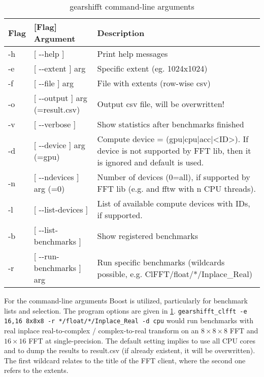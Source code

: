 
\begin{table}[htp]
 \centering
 \caption{gearshifft command-line arguments}
 \label{tab:cmdargs}
  \begin{tabular}{llp{6.4cm}}
\toprule
Flag & [Flag] Argument & Description \\
\midrule
-h&[ -{}-help ]                    &Print help messages \\
-e&[ -{}-extent ] arg              &Specific extent (eg. 1024x1024) \\
-f&[ -{}-file ] arg                &File with extents (row-wise csv) \\
-o&[ -{}-output ] arg (=result.csv)&Output csv file, will be overwritten! \\
-v&[ -{}-verbose ]                 &Show statistics after benchmarks finished \\
-d&[ -{}-device ] arg (=gpu)       &Compute device = (gpu|cpu|acc|<ID>). If 
                                  device is not supported by FFT lib, then it
                                  is ignored and default is used. \\
-n&[ -{}-ndevices ] arg (=0)       &Number of devices (0=all), if supported by 
                                  FFT lib (e.g. \clfft{} and fftw with n CPU 
                                  threads). \\
-l&[ -{}-list-devices ]            &List of available compute devices with IDs,
                                  if supported.  \\
-b&[ -{}-list-benchmarks ]         &Show registered benchmarks \\
-r&[ -{}-run-benchmarks ] arg      &Run specific benchmarks (wildcards 
                                  possible, e.g. ClFFT/float/*/Inplace\_Real)\\
\bottomrule
  \end{tabular}
\end{table}

For the command-line arguments Boost is utilized, particularly for benchmark lists and selection. The \gearshifft{} program options are given in \cref{tab:cmdargs}.\linebreak
\verb!gearshifft_clfft -e 16,16 8x8x8 -r */float/*/Inplace_Real -d cpu!\linebreak
would run \clfft{} benchmarks with real inplace real-to-complex / complex-to-real transform on an $8\times8\times8$ FFT and $16\times16$ FFT at single-precision. The default setting implies to use all CPU cores and to dump the results to result.csv (if already existent, it will be overwritten).
The first wildcard \mc{*} relates to the title of the FFT client, where the second one refers to the extents.

